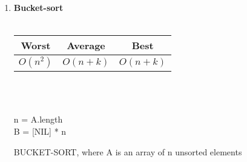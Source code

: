 \documentclass[11pt]{article}
\begin{document}
\begin{enumerate}
    \item \textbf{Bucket-sort} \\\\
    \begin{tabular}{c|c|c}
        Worst & Average & Best \\
        \hline
        $O(n^2)$ & $O(n+k)$ & $O(n+k)$
    \end{tabular}
    \\
    \begin{algorithm}[H]
        \Indm{}\\
        \Indp
            n = A.length \\
            B = [NIL] * n \\
        \caption{BUCKET-SORT, where A is an array of n unsorted elements}
    \end{algorithm}
    

\end{enumerate}
\end{document}
